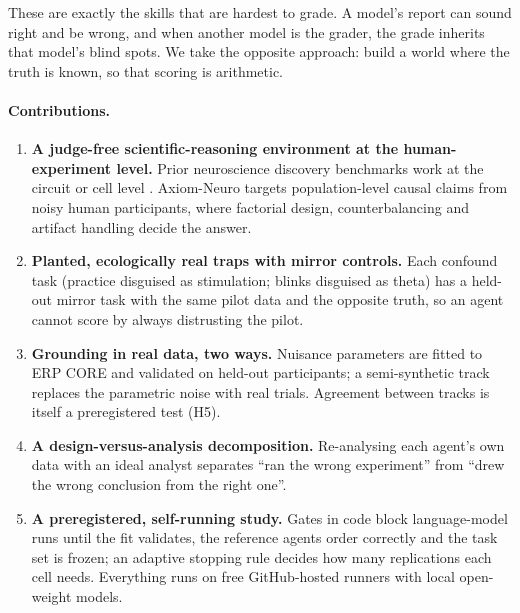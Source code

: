 \documentclass[11pt]{article}
\begin{document}
These are exactly the skills that are hardest to grade.
A model's report can sound right and be wrong, and when another model is the grader, the grade inherits that model's blind spots.
We take the opposite approach: build a world where the truth is known, so that scoring is arithmetic.

\paragraph{Contributions.}
\begin{enumerate}
  \item \textbf{A judge-free scientific-reasoning environment at the human-experiment level.}
  Prior neuroscience discovery benchmarks work at the circuit or cell level \citep{sinha2026digitalfly,lueckmann2026zebrafish,murphy2026mda}.
  Axiom-Neuro targets population-level causal claims from noisy human participants, where factorial design, counterbalancing and artifact handling decide the answer.
  \item \textbf{Planted, ecologically real traps with mirror controls.}
  Each confound task (practice disguised as stimulation; blinks disguised as theta) has a held-out mirror task with the same pilot data and the opposite truth, so an agent cannot score by always distrusting the pilot.
  \item \textbf{Grounding in real data, two ways.}
  Nuisance parameters are fitted to ERP CORE \citep{kappenman2021erpcore} and validated on held-out participants; a semi-synthetic track replaces the parametric noise with real trials. Agreement between tracks is itself a preregistered test (H5).
  \item \textbf{A design-versus-analysis decomposition.}
  Re-analysing each agent's own data with an ideal analyst separates ``ran the wrong experiment'' from ``drew the wrong conclusion from the right one''.
  \item \textbf{A preregistered, self-running study.}
  Gates in code block language-model runs until the fit validates, the reference agents order correctly and the task set is frozen; an adaptive stopping rule decides how many replications each cell needs. Everything runs on free GitHub-hosted runners with local open-weight models.
\end{enumerate}
\end{document}
